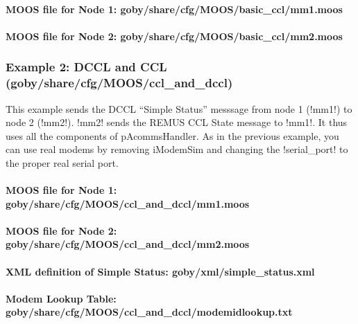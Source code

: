 \paragraph{MOOS file for Node 1: goby/share/cfg/MOOS/basic\_ccl/mm1.moos}
\resetbvlinenumber

\paragraph{MOOS file for Node 2: goby/share/cfg/MOOS/basic\_ccl/mm2.moos}
\resetbvlinenumber

\subsubsection{Example 2: DCCL and CCL (goby/share/cfg/MOOS/ccl\_and\_dccl)}
This example sends the DCCL ``Simple Status'' messsage from node 1 (!mm1!) to node 2 (!mm2!). !mm2! sends the REMUS CCL State message to !mm1!. It thus uses all the components of pAcommsHandler. As in the previous example, you can use real modems by removing iModemSim and changing the !serial_port! to the proper real serial port.

\paragraph{MOOS file for Node 1: goby/share/cfg/MOOS/ccl\_and\_dccl/mm1.moos}
\resetbvlinenumber

\paragraph{MOOS file for Node 2: goby/share/cfg/MOOS/ccl\_and\_dccl/mm2.moos}
\resetbvlinenumber

\paragraph{XML definition of Simple Status: goby/xml/simple\_status.xml}
\resetbvlinenumber

\paragraph{Modem Lookup Table: goby/share/cfg/MOOS/ccl\_and\_dccl/modemidlookup.txt}
\resetbvlinenumber

